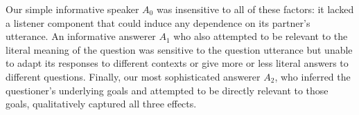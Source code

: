 \documentclass[12pt, floatsintext, jou]{apa6}
\begin{document}
Our simple informative speaker $A_0$ was insensitive to all of these factors: it lacked a listener component that could induce any dependence on its partner's utterance. An informative answerer $A_1$ who also attempted to be relevant to the literal meaning of the question was sensitive to the question utterance but unable to adapt its responses to different contexts or give more or less literal answers to different questions. Finally, our most sophisticated answerer $A_2$, who inferred the questioner's underlying goals and attempted to be directly relevant to those goals, qualitatively captured all three effects.%



\end{document}
